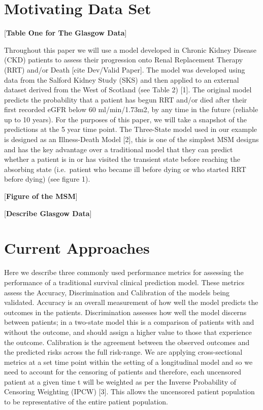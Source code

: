 \documentclass[12pt,PhD,twoside,openright]{muthesis}
\begin{document}
\hypertarget{motivating-data-set}{%
\section{Motivating Data Set}\label{motivating-data-set}}

{[}\textbf{Table One for The Glasgow Data}{]}

Throughout this paper we will use a model developed in Chronic Kidney Disease (CKD) patients to assess their progression onto Renal Replacement Therapy (RRT) and/or Death {[}cite Dev/Valid Paper{]}. The model was developed using data from the Salford Kidney Study (SKS) and then applied to an external dataset derived from the West of Scotland (see Table 2) {[}1{]}. The original model predicts the probability that a patient has begun RRT and/or died after their first recorded eGFR below 60 ml/min/1.73m2, by any time in the future (reliable up to 10 years). For the purposes of this paper, we will take a snapshot of the predictions at the 5 year time point.
The Three-State model used in our example is designed as an Illness-Death Model {[}2{]}, this is one of the simplest MSM designs and has the key advantage over a traditional model that they can predict whether a patient is in or has visited the transient state before reaching the absorbing state (i.e.~patient who became ill before dying or who started RRT before dying) (see figure 1).

{[}\textbf{Figure of the MSM}{]}

{[}\textbf{Describe Glasgow Data}{]}

\hypertarget{current-approaches}{%
\section{Current Approaches}\label{current-approaches}}

Here we describe three commonly used performance metrics for assessing the performance of a traditional survival clinical prediction model. These metrics assess the Accuracy, Discrimination and Calibration of the models being validated. Accuracy is an overall measurement of how well the model predicts the outcomes in the patients. Discrimination assesses how well the model discerns between patients; in a two-state model this is a comparison of patients with and without the outcome, and should assign a higher value to those that experience the outcome. Calibration is the agreement between the observed outcomes and the predicted risks across the full risk-range.
We are applying cross-sectional metrics at a set time point within the setting of a longitudinal model and so we need to account for the censoring of patients and therefore, each uncensored patient at a given time t will be weighted as per the Inverse Probability of Censoring Weighting (IPCW) {[}3{]}. This allows the uncensored patient population to be representative of the entire patient population.
\end{document}
